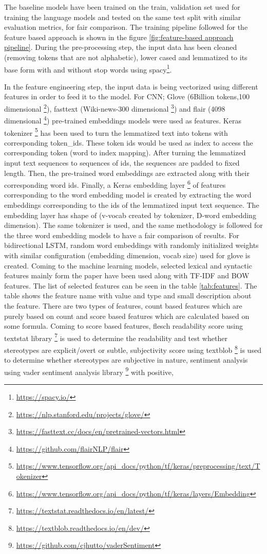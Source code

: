 The baseline models have been trained on the train, validation set used for training the language models and tested on the same test split with similar evaluation metrics, for fair comparison. The training pipeline followed for the feature based approach is shown in the figure \ref{fig:feature-based approach pipeline}. During the pre-processing step, the input data has been cleaned (removing tokens that are not alphabetic), lower cased and  lemmatized to its base form with and without stop words using spacy\footnote{\url{https://spacy.io/}}. 


In the feature engineering  step, the input data is being vectorized using different features in order to feed it to the model. For CNN; Glove (6Billion tokens,100 dimensional \footnote{\url{https://nlp.stanford.edu/projects/glove/}}), fasttext (Wiki-news-300 dimensional \footnote{\url{https://fasttext.cc/docs/en/pretrained-vectors.html}}) and flair (4098 dimensional \footnote{\url{https://github.com/flairNLP/flair}}) pre-trained embeddings models were used as features. Keras tokenizer \footnote{\url{https://www.tensorflow.org/api_docs/python/tf/keras/preprocessing/text/Tokenizer}} has been used to turn the lemmatized text into tokens with corresponding token\_ids. These token ids would be used as index to access the corresponding token (word to index mapping). After turning the lemmatized input text sequences to sequences of ids, the sequences are padded to fixed length. Then, the pre-trained word embeddings are extracted along with their corresponding word ids. Finally, a Keras embedding layer \footnote{\url{https://www.tensorflow.org/api_docs/python/tf/keras/layers/Embedding}} of features corresponding to the word embedding model is created by extracting the word embeddings corresponding to the ids of the lemmatized input text sequence. The embedding layer has shape of (v-vocab created by tokenizer, D-word embedding dimension). The same tokenizer is used, and the same methodology is followed for the three word embedding models to have a fair comparison of results. For bidirectional LSTM, random word embeddings with randomly initialized weights with similar configuration (embedding dimension, vocab size) used for glove is created. Coming to the machine learning models, selected lexical and syntactic features  mainly form the paper \cite{recasens2013linguistic}  have been used along with TF-IDF and BOW features. The list of selected features can be seen in the table \ref{tab:features}. The table shows the feature name with value and type and small description about the feature. There are two types of features, count based features which are purely based on count and score based features which are calculated based on some formula. Coming to score based features, flesch readability score \cite{flesch1948new} using textstat library \footnote{\url{https://textstat.readthedocs.io/en/latest/}} is used to determine the readability and test whether stereotypes are explicit/overt or subtle, subjectivity score using textblob \footnote{\url{https://textblob.readthedocs.io/en/dev/}} is used to determine whether stereotypes are subjective in nature, sentiment analysis using vader sentiment analysis library \footnote{\url{https://github.com/cjhutto/vaderSentiment}} with positive, 